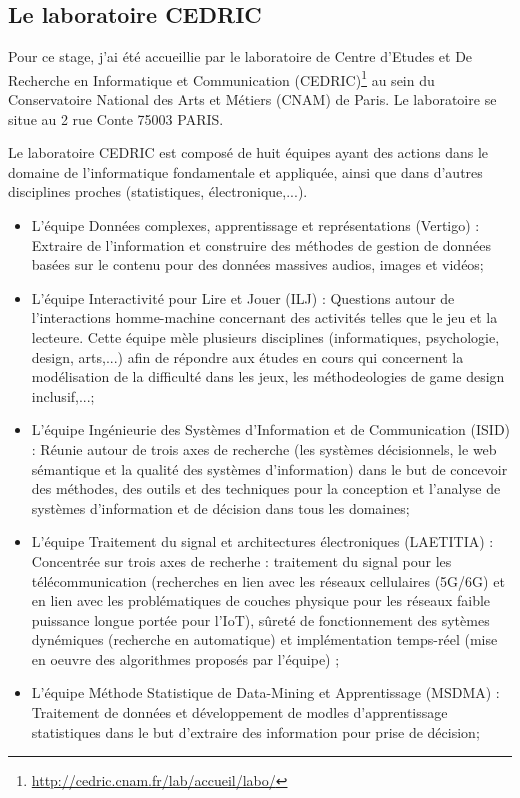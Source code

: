 \documentclass{article}
\begin{document}
	\subsection{Le laboratoire CEDRIC}
		Pour ce stage, j'ai été accueillie par le laboratoire de Centre d'Etudes et De Recherche en Informatique et Communication (CEDRIC)\footnote{\href{http://cedric.cnam.fr/lab/accueil/labo/}{http://cedric.cnam.fr/lab/accueil/labo/}} au sein du Conservatoire National des Arts et Métiers (CNAM) de Paris. 
		Le laboratoire se situe au 2 rue Conte 75003 PARIS.\par
		Le laboratoire CEDRIC est composé de huit équipes ayant des actions dans le domaine de l'informatique fondamentale et appliquée, ainsi que dans d'autres disciplines proches (statistiques, électronique,...).
		\begin{itemize}
			\item L'équipe Données complexes, apprentissage et représentations (Vertigo) : Extraire de l'information et construire des méthodes de gestion de données basées sur le contenu pour des données massives audios, images et vidéos;
			\item L'équipe Interactivité pour Lire et Jouer (ILJ) : Questions autour de l'interactions homme-machine concernant des activités telles que le jeu et la lecteure. Cette équipe mèle plusieurs disciplines (informatiques, psychologie, design, arts,...) afin de répondre aux études en cours qui concernent la modélisation de la difficulté dans les jeux, les méthodeologies de game design inclusif,...;
			\item L'équipe Ingénieurie des Systèmes d'Information et de Communication (ISID) : Réunie autour de trois axes de recherche (les systèmes décisionnels, le web sémantique et la qualité des systèmes d'information) dans le but de concevoir des méthodes, des outils et des techniques	pour la conception et l'analyse de systèmes d'information et de décision dans tous les domaines;
			\item L'équipe Traitement du signal et architectures électroniques (LAETITIA) : Concentrée sur trois axes de recherhe : traitement du signal pour les télécommunication (recherches en lien avec les réseaux cellulaires (5G/6G) et en lien avec les problématiques de couches physique pour les réseaux faible puissance longue portée pour l'IoT), sûreté de fonctionnement des sytèmes dynémiques (recherche en automatique) et implémentation temps-réel (mise en oeuvre des algorithmes proposés par l'équipe) ;
			\item L'équipe Méthode Statistique de Data-Mining et Apprentissage (MSDMA) : Traitement de données et développement de modles d'apprentissage statistiques dans le but d'extraire des information pour prise de décision;

\end{itemize}
\end{document}
